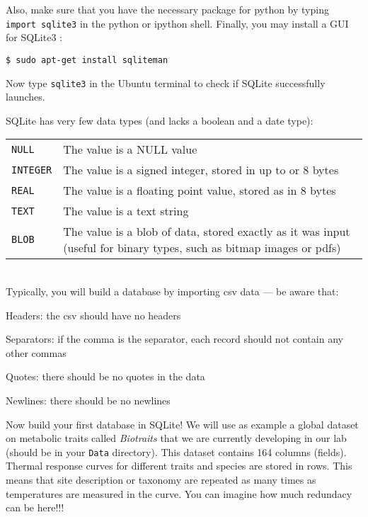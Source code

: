 Also, make sure that you have the necessary package for python by 
typing {\tt import sqlite3} in the python or ipython shell. Finally, 
you may install a GUI for SQLite3 :

\begin{lstlisting}
$ sudo apt-get install sqliteman
\end{lstlisting}

Now type {\tt sqlite3} in the Ubuntu terminal to check if SQLite 
successfully launches. 

SQLite has very few data types (and lacks a boolean and a date type):

\begin{tabular}{p{2cm} p{10cm}} 
	{\tt NULL} & The value is a NULL value\\
  {\tt INTEGER} & The value is a signed integer, stored in up to or 8
	bytes\\
  {\tt REAL} & The value is a floating point value, stored as in 8 
  bytes\\
  {\tt TEXT} & The value is a text string\\
  {\tt BLOB} & The value is a blob of data, stored exactly as it was
	input (useful for binary types, such as bitmap images or pdfs)\\
\end{tabular}\\

Typically, you will build a database by importing csv data --- be aware 
that:
    \begin{compactitem}
      \item Headers: the csv should have no headers
			\item Separators: if the comma is the separator, each record 
			should not contain any other commas
      \item Quotes: there should be no quotes in the data
      \item Newlines: there should be no newlines
    \end{compactitem}

		Now build your first database in SQLite! We will use as example a 
		global dataset on metabolic traits called {\it Biotraits} that we 
		are currently developing in our lab (should be in your {\tt Data} 
		directory). This dataset contains 164 columns (fields). Thermal 
		response curves for different traits and species are stored in 
		rows. This means that site description or taxonomy  are repeated as 
		many times as temperatures are measured in the curve. You can 
		imagine how much redundacy can be here!!!

